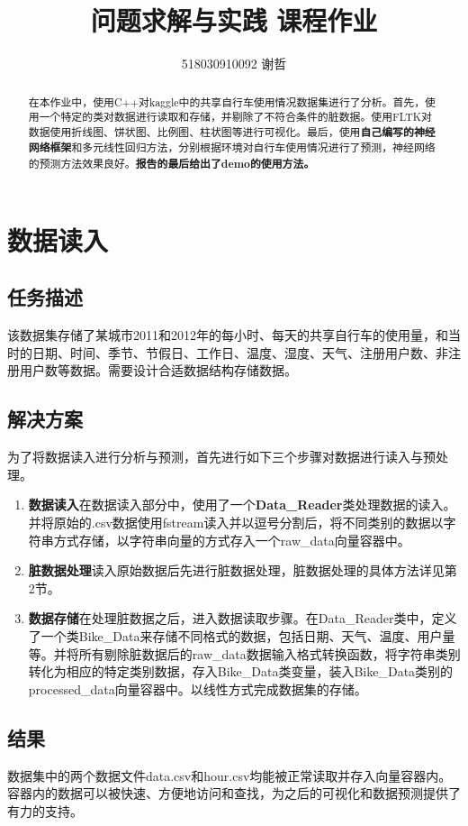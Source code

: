 \documentclass[CJK]{ctexart}
\begin{document}
\title{\textbf{问题求解与实践 \quad 课程作业}}
\author{518030910092 谢哲}
\date{}
\maketitle

\begin{abstract}
    在本作业中，使用C++对kaggle中的共享自行车使用情况数据集进行了分析。首先，使用一个特定的类对数据进行读取和存储，并剔除了不符合条件的脏数据。使用FLTK对数据使用折线图、饼状图、比例图、柱状图等进行可视化。最后，使用\textbf{自己编写的神经网络框架}和多元线性回归方法，分别根据环境对自行车使用情况进行了预测，神经网络的预测方法效果良好。\textbf{报告的最后给出了demo的使用方法。}
\end{abstract}
\section{数据读入}
\subsection{任务描述}
    该数据集存储了某城市2011和2012年的每小时、每天的共享自行车的使用量，和当时的日期、时间、季节、节假日、工作日、温度、湿度、天气、注册用户数、非注册用户数等数据。需要设计合适数据结构存储数据。
\subsection{解决方案}
为了将数据读入进行分析与预测，首先进行如下三个步骤对数据进行读入与预处理。
    \begin{enumerate}[(1)]
        \item \textbf{数据读入}\quad 在数据读入部分中，使用了一个\textbf{Data\_Reader}类处理数据的读入。并将原始的.csv数据使用fstream读入并以逗号分割后，将不同类别的数据以字符串方式存储，以字符串向量的方式存入一个raw\_data向量容器中。
        \item \textbf{脏数据处理}\quad 读入原始数据后先进行脏数据处理，脏数据处理的具体方法详见第2节。
        \item \textbf{数据存储}\quad 在处理脏数据之后，进入数据读取步骤。在Data\_Reader类中，定义了一个类Bike\_Data来存储不同格式的数据，包括日期、天气、温度、用户量等。并将所有剔除脏数据后的raw\_data数据输入格式转换函数，将字符串类别转化为相应的特定类别数据，存入Bike\_Data类变量，装入Bike\_Data类别的processed\_data向量容器中。以线性方式完成数据集的存储。
    \end{enumerate} 
\subsection{结果}
数据集中的两个数据文件data.csv和hour.csv均能被正常读取并存入向量容器内。容器内的数据可以被快速、方便地访问和查找，为之后的可视化和数据预测提供了有力的支持。
\end{document}
